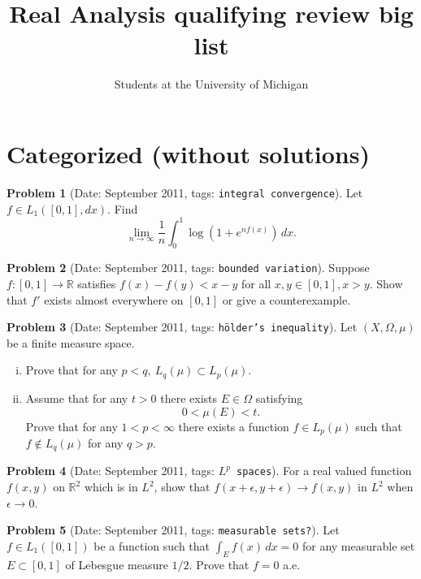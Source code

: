 \documentclass[11pt, notitlepage]{article}
\title{Real Analysis qualifying review big list}
\author{Students at the University of Michigan}
\theoremstyle{definition}
\theoremstyle{definition}
\theoremstyle{definition}
\newtheorem{probstate}{Problem}
\theoremstyle{remark}
\newenvironment{problem}[2]{
    \begin{probstate}[Date: #1, tags: \texttt{#2}]
}
{
  \end{probstate}
}
\newcommand{\R}{\mathbb{R}}
\begin{document}
\maketitle


\section{Categorized (without solutions)}

\begin{problem}{September 2011}{integral convergence}
Let $f \in L_1([0,1], dx)$. Find
 \[
   \lim_{n \to \infty} \frac{1}{n}  \int_0^1 \log \left( 1+ e^{nf(x)} \right) \, dx.
 \]
\end{problem}

\begin{problem}{September 2011}{bounded variation}
  Suppose $f:[0,1] \to \R$ satisfies $f(x)-f(y)<x-y$ for all $x,y\in [0,1], x>y$.
  Show that $f'$ exists almost everywhere on $[0,1]$ or give a counterexample.
\end{problem}

\begin{problem}{September 2011}{hölder's inequality}
  Let $(X,\Omega, \mu)$ be a finite measure space.
 \begin{enumerate}[(i)]
   \item Prove that for any $p<q, \ L_q(\mu) \subset L_p(\mu)$.
   \item Assume that for any
 $t>0$ there exists $E \in \Omega$ satisfying
 \[
  0< \mu(E) <t.
 \]
 Prove that for any $1<p< \infty$ there exists a function $f \in
 L_p(\mu)$ such that $f \notin L_q(\mu)$ for any $q>p$.
\end{enumerate}
\end{problem}

\begin{problem}{September 2011}{$L^p$ spaces}
  For a real valued function $f(x,y)$ on $\mathbb R^2$ which is in $L^2$, show that $f(x+\epsilon,y+\epsilon) \rightarrow f(x,y)$ in $L^2$ when $\epsilon \rightarrow 0$.
\end{problem}


\begin{problem}{September 2011}{measurable sets?}
  Let $f \in L_1([0,1])$ be a function such that $\int_E f (x) \, dx=0$ for any measurable set $E \subset [0,1]$ of Lebesgue measure $1/2$.
  Prove that $f=0$ a.e.
\end{problem}
\end{document}
